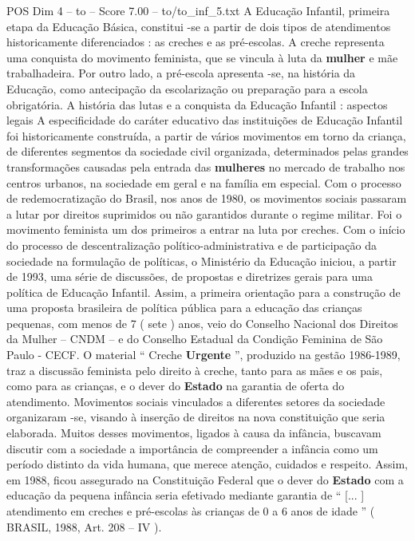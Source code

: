 \begin{textsample}{POS Dim 4 – to – Score 7.00 – to/to\_inf\_5.txt}  \label{ex:f4_pos_209}
A Educação Infantil, primeira etapa da Educação Básica, constitui -se a partir de dois tipos de atendimentos historicamente diferenciados : as creches e as pré-escolas.
A creche representa uma conquista do movimento feminista, que se vincula à luta da \textbf{mulher} e mãe trabalhadeira.
Por outro lado, a pré-escola apresenta -se, na história da Educação, como antecipação da escolarização ou preparação para a escola obrigatória.
A história das lutas e a conquista da Educação Infantil : aspectos legais A especificidade do caráter educativo das instituições de Educação Infantil foi historicamente construída, a partir de vários movimentos em torno da criança, de diferentes segmentos da sociedade civil organizada, determinados pelas grandes transformações causadas pela entrada das \textbf{mulheres} no mercado de trabalho nos centros urbanos, na sociedade em geral e na família em especial.
Com o processo de redemocratização do Brasil, nos anos de 1980, os movimentos sociais passaram a lutar por direitos suprimidos ou não garantidos durante o regime militar.
Foi o movimento feminista um dos primeiros a entrar na luta por creches.
Com o início do processo de descentralização político-administrativa e de participação da sociedade na formulação de políticas, o Ministério da Educação iniciou, a partir de 1993, uma série de discussões, de propostas e diretrizes gerais para uma política de Educação Infantil.
Assim, a primeira orientação para a construção de uma proposta brasileira de política pública para a educação das crianças pequenas, com menos de 7 ( sete ) anos, veio do Conselho Nacional dos Direitos da Mulher – CNDM – e do Conselho Estadual da Condição Feminina de São Paulo - CECF.
O material “ Creche \textbf{Urgente} ”, produzido na gestão 1986-1989, traz a discussão feminista pelo direito à creche, tanto para as mães e os pais, como para as crianças, e o dever do \textbf{Estado} na garantia de oferta do atendimento.
Movimentos sociais vinculados a diferentes setores da sociedade organizaram -se, visando à inserção de direitos na nova constituição que seria elaborada.
Muitos desses movimentos, ligados à causa da infância, buscavam discutir com a sociedade a importância de compreender a infância como um período distinto da vida humana, que merece atenção, cuidados e respeito.
Assim, em 1988, ficou assegurado na Constituição Federal que o dever do \textbf{Estado} com a educação da pequena infância seria efetivado mediante garantia de “ [... ] atendimento em creches e pré-escolas às crianças de 0 a 6 anos de idade ” ( BRASIL, 1988, Art. 208 – IV ).

\end{textsample}
